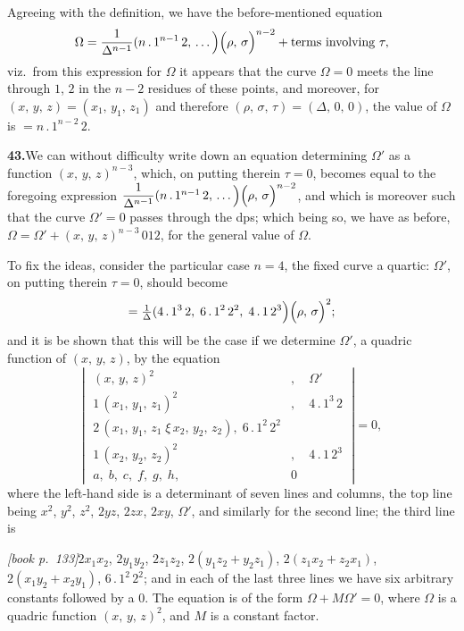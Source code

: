 \documentclass[11pt,a4paper]{article}
\theoremstyle{plain}
\theoremstyle{definition}
\theoremstyle{remark}
\begin{document}
Agreeing with the definition, we have the before-mentioned equation
\[
\Omega = \frac{1}{\Delta^{n-1}}(n\,.\,1^{n-1}\,2,\,\ldots\!\,\Bigl)\Bigl(\rho,\,\sigma\Bigr)^{n-2} + \text{terms involving }\tau,
\]
viz.\ from this expression for $\Omega$ it appears that the curve $\Omega = 0$ meets the line through $1$, $2$ in the $n - 2$ residues of these points, and moreover, for $(x,\,y,\,z) = (x_1,\,y_1,\,z_1)$ and therefore $(\rho,\,\sigma,\,\tau) = (\Delta,\,0,\,0)$, the value of $\Omega$ is $= n\,.\,1^{n-2}\,2$.

\medskip\noindent\textbf{43.}\quad We can without difficulty write down an equation determining $\Omega'$ as a function $(x,\,y,\,z)^{n-3}$, which, on putting therein $\tau = 0$, becomes equal to the foregoing expression $\dfrac{1}{\Delta^{n-1}}(n\,.\,1^{n-1}\,2,\,\ldots\!\,\Bigl)\Bigl(\rho,\,\sigma\Bigr)^{n-2}$, and which is moreover such that the curve $\Omega' = 0$ passes through the dps; which being so, we have as before, $\Omega = \Omega' + (x,\,y,\,z)^{n-3}\,012$, for the general value of $\Omega$.

To fix the ideas, consider the particular case $n = 4$, the fixed curve a quartic: $\Omega'$, on putting therein $\tau = 0$, should become
\[
= \tfrac{1}{\Delta}(4\,.\,1^3\,2,\;6\,.\,1^2\,2^2,\;4\,.\,1\,2^{3}\!\,\Bigl)\Bigl(\rho,\,\sigma\Bigr)^{2};
\]
and it is be shown that this will be the case if we determine $\Omega'$, a quadric function of $(x,\,y,\,z)$, by the equation
\[
\left|\;\begin{array}{cc}
(x,\,y,\,z)^{2} & ,\quad \Omega'\\
1\,(x_1,\,y_1,\,z_1)^{2} & ,\quad 4\,.\,1^{3}\,2\\
2\,(x_1,\,y_1,\,z_1\;\xi\,x_2,\,y_2,\,z_2),\;6\,.\,1^{2}\,2^{2}\\
1\,(x_2,\,y_2,\,z_2)^{2} & ,\quad 4\,.\,1\,2^{3}\\
a,\;b,\;c,\;f,\;g,\;h, & 0
\end{array}\;\right| = 0,
\]
where the left-hand side is a determinant of seven lines and columns, the top line being $x^2$, $y^2$, $z^2$, $2yz$, $2zx$, $2xy$, $\Omega'$, and similarly for the second line; the third line is

\medskip\noindent\textit{[book p.~133]}\quad $2x_1x_2$, $2y_1y_2$, $2z_1z_2$, $2(y_1z_2 + y_2z_1)$, $2(z_1x_2 + z_2x_1)$, $2(x_1y_2 + x_2y_1)$, $6\,.\,1^{2}\,2^{2}$; and in each of the last three lines we have six arbitrary constants followed by a $0$. The equation is of the form $\Omega + M\Omega' = 0$, where $\Omega$ is a quadric function $(x,\,y,\,z)^2$, and $M$ is a constant factor.
\end{document}
